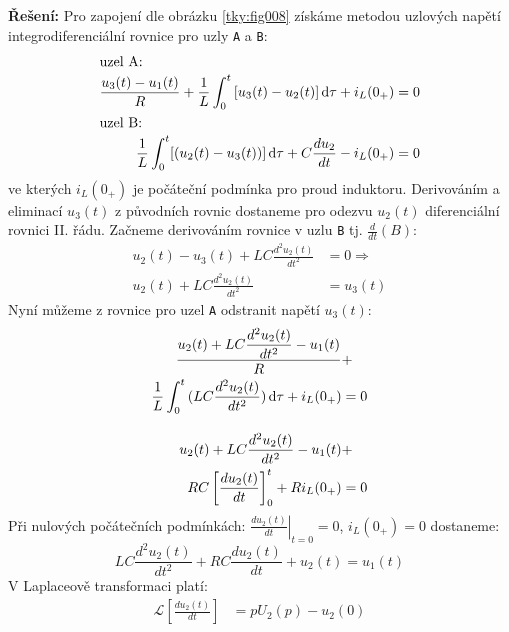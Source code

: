 \begin{mdframed}[style=mdexam]
\begin{example}
    {\centering
      \captionsetup{type=figure}
      \label{tky:fig008}
    \par}
    \noindent\textbf{Řešení:} Pro zapojení dle obrázku \ref{tky:fig008} získáme metodou uzlových
    napětí integrodiferenciální rovnice pro uzly \texttt{A} a \texttt{B}:
    \begin{gather*}
      \begin{align*}
        \shortintertext{uzel A:}
        \frac{u_3(t)-u_1(t)}{R}+\frac{1}{L}\int_0^t{[u_3(t)-u_2(t)]}\mathop{}\!\mathrm{d}\tau+i_L(0_+) &= 0  \\
        \shortintertext{uzel B:}
        \frac{1}{L}\int_0^t[(u_2(t)-u_3(t))]\mathop{}\!\mathrm{d}\tau+C\dfrac{d u_2}{d t}-i_L(0_+)           &= 0
      \end{align*}
    \end{gather*}
    ve kterých \(i_L(0_+)\) je počáteční podmínka pro proud induktoru. Derivováním a eliminací
    $u_3(t)$ z původních rovnic dostaneme pro odezvu $u_2(t)$ diferenciální rovnici II. řádu.
    Začneme derivováním rovnice v uzlu \texttt{B} tj. \(\frac{d}{dt}(B)\):
    \begin{align*}
      u_2(t)-u_3(t)+LC\frac{d^2u_2(t)}{dt^2} &=0 \Rightarrow   \\
      u_2(t)+LC\frac{d^2u_2(t)}{dt^2}        &=u_3(t)
    \end{align*}
    Nyní můžeme z rovnice pro uzel \texttt{A} odstranit napětí \(u_3(t)\):
    \begin{align*}
      \frac{u_2(t)+LC\dfrac{d^2u_2(t)}{dt^2}-u_1(t)}{R}             &+    \\
      \frac{1}{L}\int_0^t{(LC\frac{d^2u_2(t)}{dt^2})}\mathop{}\!\mathrm{d}\tau+i_L(0_+) &=  0 \\
      \shortintertext{}
      u_2(t)+LC\frac{d^2u_2(t)}{dt^2}-u_1(t)                        &+    \\
      RC\left[\frac{du_2(t)}{dt}\right]_0^t+Ri_L(0_+)               &=  0
    \end{align*}
    Při nulových počátečních podmínkách: $\left.\frac{du_2(t)}{dt}\right\rvert_{t=0}=0$,
    $i_L(0_+)=0$ dostaneme:
    \begin{equation*}
      \boxed{LC\frac{d^2u_2(t)}{dt^2}+RC\frac{du_2(t)}{dt}+u_2(t)=u_1(t)}
    \end{equation*}
    V Laplaceově transformaci platí:
    \begin{align*}
      \mathcal{L}\left[\frac{du_2(t)}{dt}\right]     &= pU_2(p)-u_2(0) \\

\end{align*}
\end{example}
\end{mdframed}
